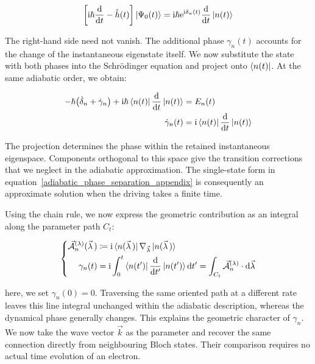 \begin{equation}
    \left[\mathrm{i}\hbar\frac{\mathrm{d}}{\mathrm{d} t}-\hat{h}(t)\right]\ket{\Psi_0(t)}
    =\mathrm{i}\hbar\mathrm{e}^{\mathrm{i}\delta_n(t)}\frac{\mathrm{d}}{\mathrm{d} t}\ket{n(t)}
\label{dynamical_phase_residual_appendix}
\end{equation}

The right-hand side need not vanish.
The additional phase $\gamma_n(t)$ accounts for the change of the instantaneous eigenstate itself.
We now substitute the state with both phases into the Schrödinger equation and project onto $\bra{n(t)}$.
At the same adiabatic order, we obtain:

\begin{equation}
\begin{aligned}
    -\hbar\bigl(\dot{\delta}_n+\dot{\gamma}_n\bigr)
    +\mathrm{i}\hbar\bra{n(t)}\frac{\mathrm{d}}{\mathrm{d} t}\ket{n(t)}
    &=E_n(t) \\
    \dot{\gamma}_n(t)
    &=\mathrm{i}\bra{n(t)}\frac{\mathrm{d}}{\mathrm{d} t}\ket{n(t)}
\end{aligned}
\label{projected_adiabatic_phase_appendix}
\end{equation}

The projection determines the phase within the retained instantaneous eigenspace.
Components orthogonal to this space give the transition corrections that we neglect in the adiabatic approximation.
The single-state form in equation~\eqref{adiabatic_phase_separation_appendix} is consequently an approximate solution when the driving takes a finite time.

Using the chain rule, we now express the geometric contribution as an integral along the parameter path $C_t$:

\begin{equation}
\left\{\begin{aligned}
    \vec{\mathcal{A}}_n^{(\lambda)}(\vec{\lambda}\,)
    &\coloneqq\mathrm{i}\bra{n(\vec{\lambda}\,)}
    \nabla_{\vec{\lambda}}\ket{n(\vec{\lambda}\,)} \\
    \gamma_n(t)
    &=\mathrm{i}\int_0^t\bra{n(t')}\frac{\mathrm{d}}{\mathrm{d} t'}\ket{n(t')}\mathrm{d} t'
    =\int_{C_t}\vec{\mathcal{A}}_n^{(\lambda)}\cdot\mathrm{d}\vec{\lambda}
\end{aligned}\right.
\label{geometric_parameter_integral_appendix}
\end{equation}

here, we set $\gamma_n(0)=0$.
Traversing the same oriented path at a different rate leaves this line integral unchanged within the adiabatic description,
whereas the dynamical phase generally changes.
This explains the geometric character of $\gamma_n$.
We now take the wave vector $\vec{k}$ as the parameter and recover the same connection directly from neighbouring Bloch states.
Their comparison requires no actual time evolution of an electron.

